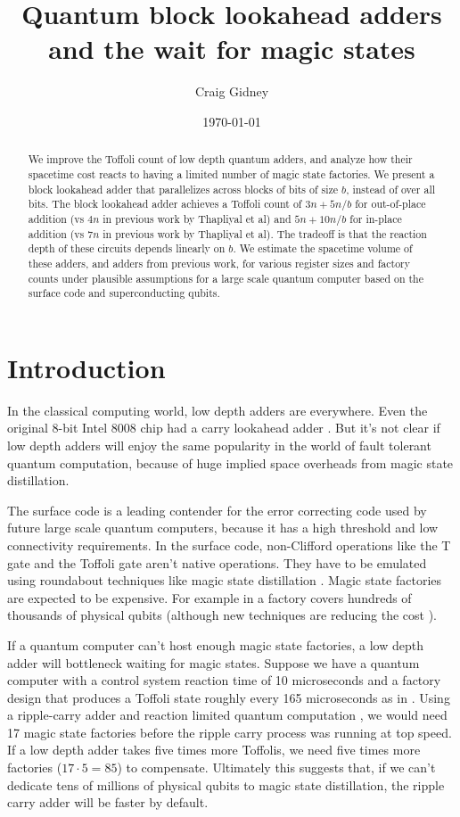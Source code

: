 \documentclass[onecolumn,unpublished]{quantumarticle}
\title{Quantum block lookahead adders and the wait for magic states}
\date{\today}
\author{Craig Gidney}
\affiliation{Google Inc., Santa Barbara, California 93117, USA}
\theoremstyle{definition}
\theoremstyle{definition}
\theoremstyle{definition}
\begin{document}
\maketitle

\begin{abstract}
We improve the Toffoli count of low depth quantum adders, and analyze how their spacetime cost reacts to having a limited number of magic state factories.
We present a block lookahead adder that parallelizes across blocks of bits of size $b$, instead of over all bits.
The block lookahead adder achieves a Toffoli count of $3n + 5n/b$ for out-of-place addition (vs $4n$ in previous work by Thapliyal et al) and $5n + 10n/b$ for in-place addition (vs $7n$ in previous work by Thapliyal et al).
The tradeoff is that the reaction depth of these circuits depends linearly on $b$.
We estimate the spacetime volume of these adders, and adders from previous work, for various register sizes and factory counts under plausible assumptions for a large scale quantum computer based on the surface code and superconducting qubits.
\end{abstract}

\section{Introduction}

In the classical computing world, low depth adders are everywhere.
Even the original 8-bit Intel 8008 chip had a carry lookahead adder \cite{shirriff2020reverseengineer8008}.
But it's not clear if low depth adders will enjoy the same popularity in the world of fault tolerant quantum computation, because of huge implied space overheads from magic state distillation.

The surface code \cite{fowler2012surfacereview} is a leading contender for the error correcting code used by future large scale quantum computers, because it has a high threshold and low connectivity requirements.
In the surface code, non-Clifford operations like the T gate and the Toffoli gate aren't native operations.
They have to be emulated using roundabout techniques like magic state distillation \cite{bravyi2005magicstate}.
Magic state factories are expected to be expensive.
For example in \cite{gidney2019catalyzed} a factory covers hundreds of thousands of physical qubits (although new techniques are reducing the cost \cite{litinski2019magicnotcostly}).

If a quantum computer can't host enough magic state factories, a low depth adder will bottleneck waiting for magic states.
Suppose we have a quantum computer with a control system reaction time of 10 microseconds and a factory design that produces a Toffoli state roughly every 165 microseconds as in \cite{gidney2019autoccz}.
Using a ripple-carry adder and reaction limited quantum computation \cite{fowler2012timeoptimal,gidney2019autoccz}, we would need 17 magic state factories before the ripple carry process was running at top speed.
If a low depth adder takes five times more Toffolis, we need five times more factories ($17 \cdot 5 = 85$) to compensate.
Ultimately this suggests that, if we can't dedicate tens of millions of physical qubits to magic state distillation, the ripple carry adder will be faster by default.
\end{document}
